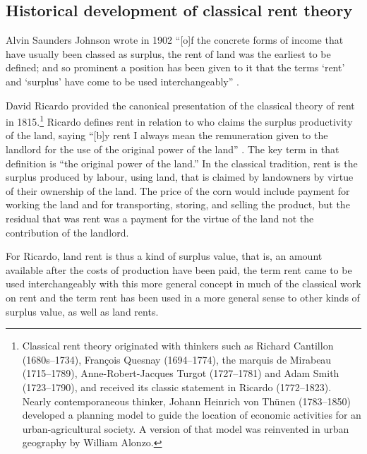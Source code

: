 \subsection{Historical development of classical rent theory}
Alvin Saunders Johnson wrote in 1902 ``[o]f the concrete forms of income that have usually been classed as surplus, the rent of land was the earliest to be defined; and so prominent a position has been given to it that the terms `rent' and `surplus' have come to be used interchangeably'' \cite{johnsonRentModernEconomic1902}. 

David Ricardo provided the canonical presentation of the classical theory of rent \cite{ricardoEssayInfluenceLow1815} in 1815.\footnote{Classical rent theory originated with thinkers such as Richard Cantillon (1680s--1734), Fran\c{c}ois Quesnay (1694--1774), the marquis de Mirabeau (1715--1789), Anne-Robert-Jacques Turgot (1727--1781) and Adam Smith (1723--1790), and received its classic statement in Ricardo (1772--1823). Nearly contemporaneous thinker, Johann Heinrich von Th\"unen (1783--1850) developed a planning model to guide the location of economic activities for an urban-agricultural society. A version of that model was reinvented in urban geography by William Alonzo.} 
 Ricardo defines rent in relation to who claims the surplus productivity of the land, %
saying ``[b]y rent I always mean the remuneration given to the landlord for the use of the original power of the land'' \cite{ricardoEssayInfluenceLow1815}. The key term in that definition is ``the original power of the land.'' In the classical tradition, rent is the surplus produced by labour, using land, that is claimed by landowners by virtue of their ownership of the land. The price of the corn would include payment for working the land and for transporting, storing, and selling the product, but the residual that was rent was a payment for the virtue of the land not the contribution of the landlord.

For Ricardo, \gls{land rent} is thus a kind of \gls{surplus value}, that is, an amount available after the costs of production have been paid, the term rent came to be used interchangeably with this more general concept in much of the classical work on rent and the term rent has been used in a more general sense to other kinds of surplus value, as well as land rents.


